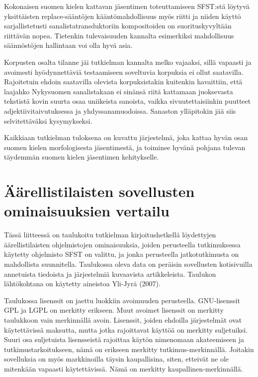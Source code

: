 \documentclass[free]{flammie}
\begin{document}
Kokonaisen suomen kielen kattavan jäsentimen toteuttamiseen SFST:stä löytyvä
yksittäisten replace-sääntöjen kääntömahdollisuus myös riitti ja niiden käyttö sarjallistetusti sanalistatransduktoriin kompositoiden on suorituskyvyltään riittävän
nopea. Tietenkin tulevaisuuden kannalta esimerkiksi mahdollisuus säännöstöjen
hallintaan voi olla hyvä asia.

Korpusten osalta tilanne jäi tutkielman kannalta melko vajaaksi, sillä vapaasti ja
avoimesti hyödynnettäviä testaamiseen soveltuvia korpuksia ei ollut saatavilla.
Rajoitetuin ehdoin saatavilla olevista korpuksistakin kuitenkin havaittiin, että laajahko Nykysuomen sanalistakaan ei sinänsä riitä kattamaan juoksevasta tekstistä
kovin suurta osaa uniikeista sanoista, vaikka sivuutettaisiinkin puutteet adjektiivitaivutuksessa ja yhdyssanamuodoissa. Sanaston ylläpitokin jää siis selvitettäväksi
kysymykseksi.

Kaikkiaan tutkielman tuloksena on kuvattu järjestelmä, joka kattaa hyvän osan
suomen kielen morfologisesta jäsentimestä, ja toiminee hyvänä pohjana tulevan
täydemmän suomen kielen jäsentimen kehitykselle.



\appendix

\section{Äärellistilaisten sovellusten ominaisuuksien vertailu}

Tässä liitteessä on taulukoitu tutkielman kirjoitushetkellä löydettyjen äärellistilaisten ohjelmistojen ominaisuuksia, joiden perusteella tutkimuksessa käytetty ohjelmisto SFST on valittu, ja jonka perusteella jatkotutkimusta on mahdollista suunnitella. Taulukossa oleva data on peräisin sovellusten kotisivuilla annetuista tiedoista ja järjestelmiä kuvaavista artikkeleista. Taulukon lähtökohtana on käytetty
aineistoa Yli-Jyrä (2007).

Taulukossa lisenssit on jaettu luokkiin avoimuuden perusteella. GNU-lisenssit
GPL ja LGPL on merkitty erikseen. Muut avoimet lisenssit on merkitty taulukkoon vain merkinnällä avoin. Lisenssit, joiden ehdoilla järjestelmät ovat käytettävissä maksutta, mutta jotka rajoittavat käyttöä on merkitty suljetuiksi. Suuri osa
suljetuista lisensseistä rajoittaa käytön nimenomaan akateemiseen ja tutkimustarkoitukseen, nämä on erikseen merkitty tutkimus-merkinnällä. Joitakin sovelluksia
on myös markkinoilla täysin kaupallisina, siten, etteivät ne ole mitenkään vapaasti
käytettävissä. Nämä on merkitty kaupallinen-merkinnällä.
\end{document}
